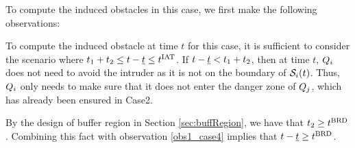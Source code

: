To compute the induced obstacles in this case, we first make the following observations:
\begin{observation} \label{obs1_case4}
To compute the induced obstacle at time $t$ for this case, it is sufficient to consider the scenario where $t_1 + t_2 \leq t - \underline{t} \leq t^\text{IAT}$. If $t - \underline{t} < t_1 + t_2$, then at time $t$, $Q_i$ does not need to avoid the intruder as it is not on the boundary of $\mathcal{S}_i(t)$. Thus, $Q_i$ only needs to make sure that it does not enter the danger zone of $Q_j$, which has already been ensured in Case2. 
\end{observation}
\begin{observation} \label{obs2_case4}
By the design of buffer region in Section \ref{sec:buffRegion}, we have that $t_2 \geq t^\text{BRD}$. Combining this fact with observation \ref{obs1_case4} implies that $t- \underline{t} \geq t^\text{BRD}$.
\end{observation}


